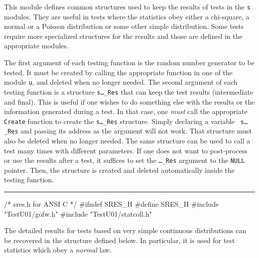 
This module defines common structures used to keep the results of tests
in the {\tt s} modules. They are useful in tests where the statistics
obey either a chi-square, a normal or a Poisson distribution or some other
simple distribution. Some tests require more specialized structures for
the results and those are defined in the appropriate modules.

The first argument of each testing function is the random number generator 
to be tested. It must be created by calling the appropriate function
in one of the module {\tt u}, and deleted when no longer needed.
The second argument of each testing function is a structure 
{\tt s\ldots\_Res} that can keep the test results (intermediate and final).
This is useful if one wishes to do something else with the
results or the information generated during a test. In that case, one 
{\it must} call the appropriate {\tt Create} function to create the
 {\tt s\ldots\_Res} structure. Simply declaring a variable  {\tt
s\ldots\_Res} and passing its address as the argument will not work.
That structure must also be deleted when no longer needed.
The same structure can
be used to call a test many times with different parameters.
If one does not want to post-process or use the results after a test,
it suffices to set the {\tt \ldots\_Res} argument to the {\tt NULL} pointer.
Then, the structure is created and deleted automatically inside the 
testing function.


\bigskip\hrule
\code\hide
/* sres.h  for ANSI C */
#ifndef SRES_H
#define SRES_H
\endhide
#include "TestU01/gofw.h"
#include "TestU01/statcoll.h"
\endcode




The detailed results for tests based on very simple continuous
distributions can be recovered in the structure defined below. In
 particular, it is used for test statistics which obey a {\em normal\/} law.

\code

